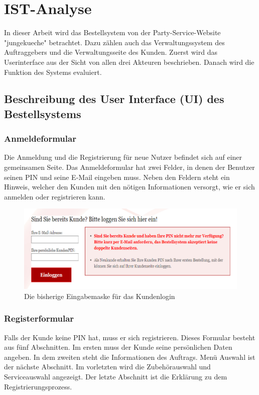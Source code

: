 \chapter{IST-Analyse}
In dieser Arbeit wird das Bestellsystem von der Party-Service-Website "jungekueche" betrachtet. Dazu zählen auch das Verwaltungssystem des Auftraggebers und die Verwaltungsseite des Kunden. Zuerst wird das Userinterface aus der Sicht von allen drei Akteuren beschrieben. Danach wird die Funktion des Systems evaluiert.

\section{Beschreibung des User Interface (UI) des Bestellsystems} 

\subsection{Anmeldeformular}
Die Anmeldung und die Registrierung für neue Nutzer befindet sich auf einer gemeinsamen Seite. 
Das Anmeldeformular hat zwei Felder, in denen der Benutzer seinen PIN und seine E-Mail eingeben muss. Neben den Feldern steht ein Hinweis, welcher den Kunden mit den nötigen Informationen versorgt, wie er sich anmelden oder registrieren kann.  


\begin{figure}[h]
	\centering
	\includegraphics[width=0.7\linewidth]{Graphics/anmeldeformular.png}
	\caption[Anmeldeformular]{Die bisherige Eingabemaske für das Kundenlogin}
	\label{fig:anmeldeformular}
\end{figure}


\subsection{Registerformular}

Falls der Kunde keine PIN hat, muss er sich registrieren. Dieses Formular besteht aus fünf Abschnitten. Im ersten muss der Kunde seine persönlichen Daten angeben. In dem zweiten steht die Informationen des Auftrags. Menü Auswahl ist der nächste Abschnitt. Im vorletzten wird die Zubehörauswahl und Serviceauswahl angezeigt. Der letzte Abschnitt ist die Erklärung zu dem Registrierungsprozess. 

